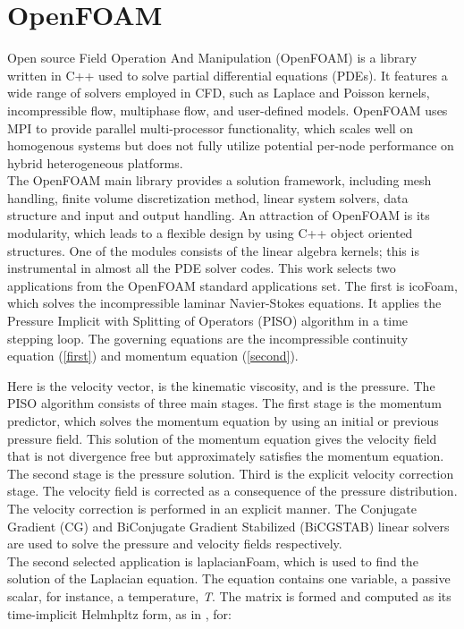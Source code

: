 \documentclass[3p,times]{elsarticle}
\begin{document}
\section{OpenFOAM}
\label{OpenFOAM}
Open source Field Operation And Manipulation (OpenFOAM) \cite{openfoam} is a library written in C++ used to solve partial differential equations (PDEs). It features a wide range of solvers employed in CFD, such as Laplace and Poisson kernels, incompressible flow, multiphase flow, and user-defined models. OpenFOAM uses MPI to provide parallel multi-processor functionality, which scales well on homogenous systems but does not fully utilize potential per-node performance on hybrid heterogeneous platforms. ~\\

The OpenFOAM main library provides a solution framework, including mesh handling, finite volume discretization method, linear system solvers, data structure and input and output handling. An attraction of OpenFOAM is its modularity, which leads to a flexible design by using C++ object oriented structures. One of the modules consists of the linear algebra kernels; this is instrumental in almost all the PDE solver codes. This work selects two applications from the OpenFOAM standard applications set. The first is icoFoam, which solves the incompressible laminar Navier-Stokes equations. It applies the Pressure Implicit with Splitting of Operators (PISO) \cite{piso} algorithm in a time stepping loop. The governing equations are the incompressible continuity equation (\ref{first}) and momentum equation (\ref{second}). 


Here \emph{} is the velocity vector, \emph{} is the kinematic viscosity, and \emph{} is the pressure. The PISO algorithm consists of three main stages. The first stage is the momentum predictor, which solves the momentum equation by using an initial or previous pressure field. This solution of the momentum equation gives the velocity field that is not divergence free but approximately satisfies the momentum equation. The second stage is the pressure solution. Third is the explicit velocity correction stage. The velocity field is corrected as a consequence of the pressure distribution. The velocity correction is performed in an explicit manner. The Conjugate Gradient (CG) and BiConjugate Gradient Stabilized (BiCGSTAB) linear solvers are used to solve the pressure and velocity fields respectively.\\

The second selected application is laplacianFoam, which is used to find the solution of the Laplacian equation. The equation contains one variable, a passive scalar, for instance, a temperature, \emph{T}. The matrix is formed and computed as its time-implicit Helmhpltz form, as in \cite{openfoam}, for:
\end{document}
